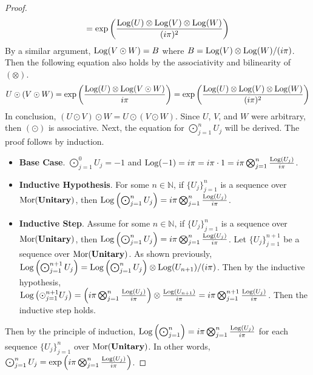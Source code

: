 \begin{proof}
\begin{equation*}
        =
        \exp\left( \frac{ \operatorname{Log}(U) \otimes \operatorname{Log}(V) \otimes \operatorname{Log}(W)}{(i\pi)^2} \right)
    \end{equation*}
    By a similar argument, $\operatorname{Log}( V \odot W ) = B$ where $B = \operatorname{Log}( V ) \otimes \operatorname{Log}( W ) / (i\pi)$.
    Then the following equation also holds by the associativity and bilinearity of $( \otimes )$.
    \begin{equation*}
        U \odot ( V \odot W )
        =
        \exp\left( \frac{\operatorname{Log}(U) \otimes \operatorname{Log}( V \odot W )}{i\pi} \right)
        =
        \exp\left( \frac{ \operatorname{Log}(U) \otimes \operatorname{Log}(V) \otimes \operatorname{Log}(W)}{(i\pi)^2} \right)
    \end{equation*}
    In conclusion, $( U \odot V ) \odot W = U \odot ( V \odot W )$.
    Since $U$, $V$, and $W$ were arbitrary, then $( \odot )$ is associative.
    Next, the equation for $\bigodot_{j=1}^n U_j$ will be derived.
    The proof follows by induction.
    \begin{itemize}
    \item \textbf{Base Case}.
          $\bigodot_{j=1}^0 U_j = -1$ and $\operatorname{Log}( -1 ) = i\pi = i\pi \cdot 1 = i\pi \bigotimes_{j=1}^n \frac{\operatorname{Log}( U_j )}{i\pi}$.
    \item \textbf{Inductive Hypothesis}.
          For some $n \in \mathbb{N}$, if $\{ U_j \}_{j=1}^n$ is a sequence over $\operatorname{Mor}( \mathbf{Unitary} )$, then $\operatorname{Log}\left( \bigodot_{j=1}^n U_j \right) = i\pi \bigotimes_{j=1}^n \frac{\operatorname{Log}( U_j )}{i\pi}$.
    \item \textbf{Inductive Step}.
          Assume for some $n \in \mathbb{N}$, if $\{ U_j \}_{j=1}^n$ is a sequence over $\operatorname{Mor}( \mathbf{Unitary} )$, then $\operatorname{Log}\left( \bigodot_{j=1}^n U_j \right) = i\pi \bigotimes_{j=1}^n \frac{\operatorname{Log}( U_j )}{i\pi}$.
          Let $\{ U_j \}_{j=1}^{n+1}$ be a sequence over $\operatorname{Mor}( \mathbf{Unitary} )$.
          As shown previously, $\operatorname{Log}\left( \bigodot_{j=1}^{n+1} U_j \right) = \operatorname{Log}\left( \bigodot_{j=1}^n U_j \right) \otimes \operatorname{Log}( U_{n+1} ) / (i\pi)$.
          Then by the inductive hypothesis, $\operatorname{Log}\left( \odot_{j=1}^{n+1} U_j \right) = \left( i\pi \bigotimes_{j=1}^n \frac{\operatorname{Log}( U_j )}{i\pi} \right) \otimes \frac{\operatorname{Log}( U_{n+1} )}{i\pi} = i\pi \bigotimes_{j=1}^{n+1} \frac{\operatorname{Log}( U_j )}{i\pi}$.
          Then the inductive step holds.
    \end{itemize}
    Then by the principle of induction, $\operatorname{Log}\left( \bigodot_{j=1}^n \right) = i\pi \bigotimes_{j=1}^n \frac{\operatorname{Log}( U_j )}{i\pi}$ for each sequence $\{ U_j \}_{j=1}^n$ over $\operatorname{Mor}( \mathbf{Unitary} )$.
    In other words, $\bigodot_{j=1}^n U_j = \exp\left( i\pi \bigotimes_{j=1}^{n} \frac{\operatorname{Log}( U_j )}{i\pi} \right)$.
\end{proof}